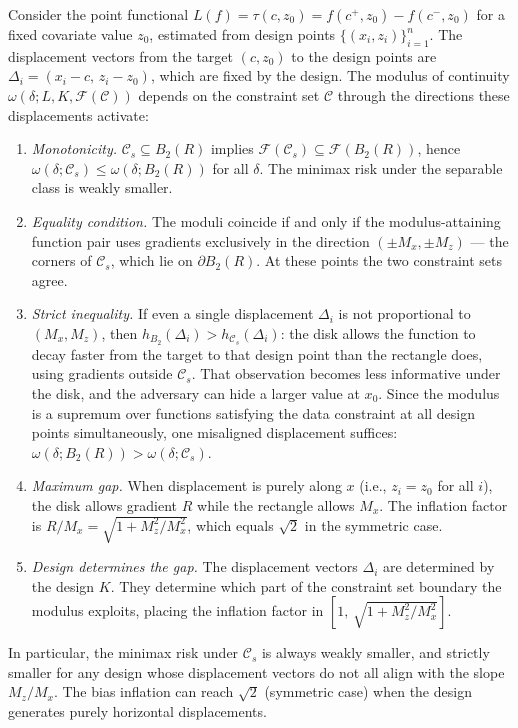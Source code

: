 \begin{remark}\label{rem:modulus_separation}
	Consider the point functional $L(f) = \tau(c, z_0) = f(c^+, z_0) - f(c^-, z_0)$ for a fixed covariate value $z_0$, estimated from design points $\{(x_i, z_i)\}_{i=1}^n$.
	The displacement vectors from the target $(c, z_0)$ to the design points are $\Delta_i = (x_i - c,\, z_i - z_0)$, which are fixed by the design.
	The modulus of continuity $\omega(\delta; L, K, \mathcal{F}(\mathcal{C}))$ depends on the constraint set $\mathcal{C}$ through the directions these displacements activate:
	\begin{enumerate}
		\item \emph{Monotonicity.}  $\mathcal{C}_s \subseteq B_2(R)$ implies $\mathcal{F}(\mathcal{C}_s) \subseteq \mathcal{F}(B_2(R))$, hence $\omega(\delta; \mathcal{C}_s) \leq \omega(\delta; B_2(R))$ for all $\delta$.  The minimax risk under the separable class is weakly smaller.
		\item \emph{Equality condition.}  The moduli coincide if and only if the modulus-attaining function pair uses gradients exclusively in the direction $(\pm M_x, \pm M_z)$ --- the corners of $\mathcal{C}_s$, which lie on $\partial B_2(R)$.  At these points the two constraint sets agree.
		\item \emph{Strict inequality.}  If even a single displacement $\Delta_i$ is not proportional to $(M_x, M_z)$, then $h_{B_2}(\Delta_i) > h_{\mathcal{C}_s}(\Delta_i)$: the disk allows the function to decay faster from the target to that design point than the rectangle does, using gradients outside $\mathcal{C}_s$.  That observation becomes less informative under the disk, and the adversary can hide a larger value at $x_0$.  Since the modulus is a supremum over functions satisfying the data constraint at all design points simultaneously, one misaligned displacement suffices: $\omega(\delta; B_2(R)) > \omega(\delta; \mathcal{C}_s)$.
		\item \emph{Maximum gap.}  When displacement is purely along $x$ (i.e., $z_i = z_0$ for all $i$), the disk allows gradient $R$ while the rectangle allows $M_x$.  The inflation factor is $R / M_x = \sqrt{1 + M_z^2 / M_x^2}$, which equals $\sqrt{2}$ in the symmetric case.
		\item \emph{Design determines the gap.}  The displacement vectors $\Delta_i$ are determined by the design $K$.  They determine which part of the constraint set boundary the modulus exploits, placing the inflation factor in $[1,\, \sqrt{1 + M_z^2 / M_x^2}]$.
	\end{enumerate}
	In particular, the minimax risk under $\mathcal{C}_s$ is always weakly smaller, and strictly smaller for any design whose displacement vectors do not all align with the slope $M_z / M_x$.
	The bias inflation can reach $\sqrt{2}$ (symmetric case) when the design generates purely horizontal displacements.
\end{remark}

